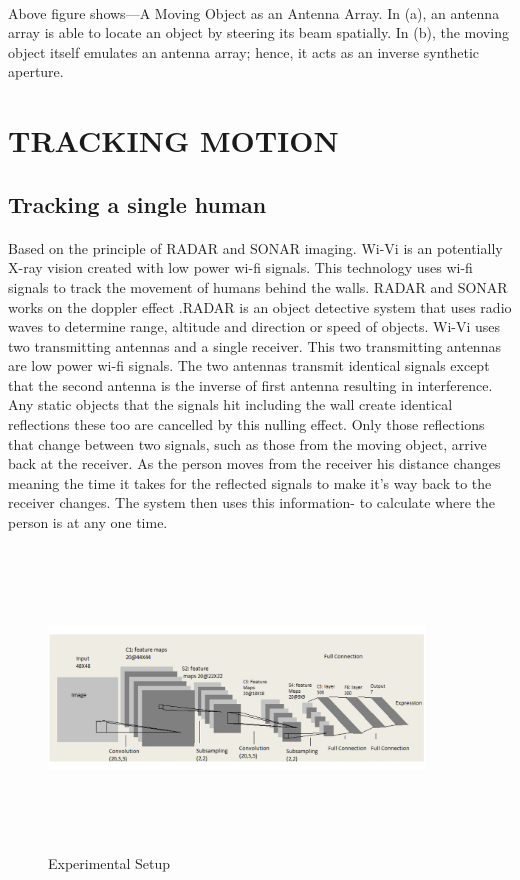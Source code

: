 \documentclass[a4paper,12pt,oneside]{article}
\begin{document}
\paragraph{}
Above figure shows—A Moving Object as an Antenna Array. In (a), an antenna array is able to locate
an object by steering its beam spatially. In (b), the moving object itself emulates an antenna
array; hence, it acts as an inverse synthetic aperture.

\newpage
\section{TRACKING MOTION}
\subsection{Tracking a single human}
\paragraph{}
Based on the principle of RADAR and SONAR imaging. Wi-Vi is an potentially X-ray
vision created with low power wi-fi signals. This technology uses wi-fi signals to track the
movement of humans behind the walls. RADAR and SONAR works on the doppler effect
.RADAR is an object detective system that uses radio waves to determine range, altitude and
direction or speed of objects. Wi-Vi uses two transmitting antennas and a single receiver. This
two transmitting antennas are low power wi-fi signals. The two antennas transmit identical
signals except that the second antenna is the inverse of first antenna resulting in interference.
Any static objects that the signals hit including the wall create identical reflections these too are
cancelled by this nulling effect. Only those reflections that change between two signals, such as
those from the moving object, arrive back at the receiver. As the person moves from the receiver
his distance changes meaning the time it takes for the reflected signals to make it’s way back to
the receiver changes. The system then uses this information- to calculate where the person is at
any one time.

\begin{figure}[H]
\centering
\includegraphics[height=8cm,width=10cm]{5.png}
\caption{Experimental Setup}
\end{figure}
\end{document}
